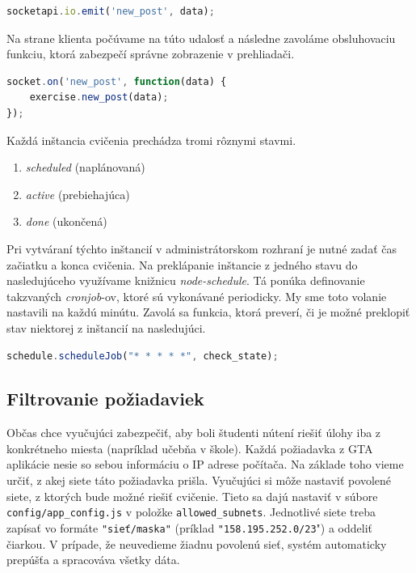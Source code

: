 \begin{lstlisting}[language=JavaScript]
socketapi.io.emit('new_post', data);
\end{lstlisting}

Na strane klienta počúvame na túto udalosť a následne zavoláme obsluhovaciu
funkciu, ktorá zabezpečí správne zobrazenie v prehliadači.

\begin{lstlisting}[language=JavaScript]
socket.on('new_post', function(data) {
    exercise.new_post(data);
});
\end{lstlisting}

Každá inštancia cvičenia prechádza tromi rôznymi stavmi.
\begin{enumerate}
	\item \textit{scheduled} (naplánovaná)
	\item \textit{active} (prebiehajúca)
	\item \textit{done} (ukončená)
\end{enumerate}

Pri vytváraní týchto inštancií v administrátorskom rozhraní je nutné zadať
čas začiatku a konca cvičenia. Na preklápanie inštancie z jedného stavu do nasledujúceho
využívame knižnicu \textit{node-schedule}. Tá ponúka definovanie takzvaných
\textit{cronjob}-ov, ktoré sú vykonávané periodicky. My sme toto volanie nastavili
na každú minútu. Zavolá sa funkcia, ktorá preverí, či je možné preklopiť stav
niektorej z inštancií na nasledujúci.

\begin{lstlisting}[language=JavaScript]
schedule.scheduleJob("* * * * *", check_state);
\end{lstlisting} 

\subsection{Filtrovanie požiadaviek}
\label{sec:gtadataprocessing:ipfilter}

Občas chce vyučujúci zabezpečiť, aby boli študenti nútení riešiť úlohy
iba z konkrétneho miesta (napríklad učebňa v škole). Každá požiadavka z GTA aplikácie
nesie so sebou informáciu o IP adrese počítača. Na základe toho vieme určiť,
z akej siete táto požiadavka prišla. Vyučujúci si môže nastaviť povolené siete,
z ktorých bude možné riešiť cvičenie. Tieto sa dajú nastaviť v súbore
\verb'config/app_config.js' v položke \verb'allowed_subnets'.
Jednotlivé siete treba zapísať vo formáte \verb'"sieť/maska"'
(príklad \verb'"158.195.252.0/23'") a oddeliť čiarkou.
V prípade, že neuvedieme žiadnu povolenú sieť, systém automaticky prepúšťa
a spracováva všetky dáta.

